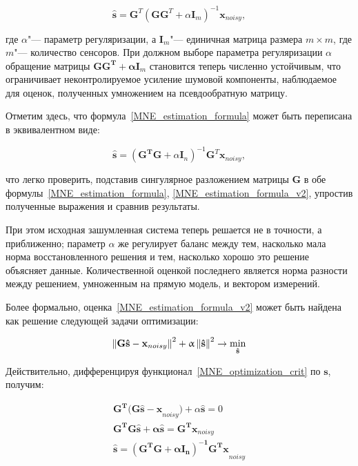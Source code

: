 \begin{equation}
    \mathbf{\hat{s}} = \mathbf{G}^T(\mathbf{GG}^T + \alpha \mathbf{I}_m)^{-1}\mathbf{x}_{noisy},
    \label{MNE_estimation_formula}
\end{equation}

где $\alpha$"--- параметр регуляризации, а $\mathbf{I}_m$"--- единичная матрица
размера $m \times m$, где $m$"--- количество сенсоров. При должном выборе параметра
регуляризации $\alpha$ обращение матрицы $\mathbf{GG^T + \alpha I}_m$
становится теперь численно устойчивым, что ограничивает неконтролируемое
усиление шумовой компоненты, наблюдаемое для оценок, полученных умножением на
псевдообратную матрицу.

Отметим здесь, что формула~\ref{MNE_estimation_formula} может быть переписана в
эквивалентном виде:

\begin{equation}
    \mathbf{\hat{s}} = (\mathbf{G^TG} + \alpha \mathbf{I}_n)^{-1}\mathbf{G}^T\mathbf{x}_{noisy},
    \label{MNE_estimation_formula_v2}
\end{equation}

что легко проверить, подставив сингулярное разложением матрицы $\mathbf{G}$ в
обе формулы~\ref{MNE_estimation_formula}, \ref{MNE_estimation_formula_v2},
упростив полученные выражения и сравнив результаты.

При этом исходная зашумленная система теперь решается не в точности, а
приближенно; параметр $\alpha$ же регулирует баланс между
тем, насколько мала норма восстановленного решения и тем, насколько
хорошо это решение объясняет данные. Количественной оценкой последнего
является норма разности между решением, умноженным на прямую модель,
и вектором измерений.

Более формально, оценка~\ref{MNE_estimation_formula_v2} может быть найдена
как решение следующей задачи оптимизации:

\begin{equation}
    \left\lVert\mathbf{G\hat{s} - x}_{noisy}\right\rVert^2 + \upalpha\left\lVert\mathbf{\hat{s}}\right\rVert^2 \rightarrow \underset{\mathbf{\hat{s}}}{\min}
    \label{MNE_optimization_crit}
\end{equation}

Действительно, дифференцируя функционал~\ref{MNE_optimization_crit} по $\mathbf{s}$,
получим:

\begin{gather*}
    \mathbf{G^T(G\hat{s} - x}_{noisy}) + \alpha\mathbf{\hat{s}} = 0\\
    \mathbf{G^TG\hat{s} + \alpha \hat{s} = G^Tx}_{noisy}\\
    \mathbf{\hat{s} = (G^TG + \alpha I_n)^{-1}G^Tx}_{noisy}
\end{gather*}


